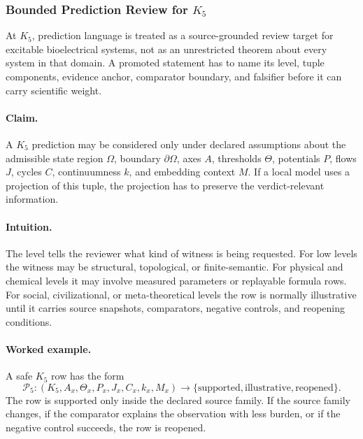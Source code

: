 \subsubsection{Bounded Prediction Review for \texorpdfstring{$K_5$}{K_5}}
\label{sec:predictions-k5-r014}

At \(K_5\), prediction language is treated as a source-grounded review
target for excitable bioelectrical systems, not as an unrestricted theorem about every system in that
domain. A promoted statement has to name its level, tuple components, evidence
anchor, comparator boundary, and falsifier before it can carry scientific
weight.

\paragraph{Claim.}
A \(K_5\) prediction may be considered only under declared assumptions
about the admissible state region \(\Omega\), boundary \(\partial\Omega\), axes
\(A\), thresholds \(\Theta\), potentials \(P\), flows \(J\), cycles \(C\),
continuumness \(k\), and embedding context \(M\). If a local model uses a
projection of this tuple, the projection has to preserve the verdict-relevant
information.

\paragraph{Intuition.}
The level tells the reviewer what kind of witness is being requested. For low
levels the witness may be structural, topological, or finite-semantic. For
physical and chemical levels it may involve measured parameters or replayable
formula rows. For social, civilizational, or meta-theoretical levels the row is
normally illustrative until it carries source snapshots, comparators, negative
controls, and reopening conditions.

\paragraph{Worked example.}
A safe \(K_5\) row has the form
\[
  \mathcal{P}_{5}:
  (K_5, A_x, \Theta_x, P_x, J_x, C_x, k_x, M_x)
  \longrightarrow
  \{\mathrm{supported},\mathrm{illustrative},\mathrm{reopened}\}.
\]
The row is supported only inside the declared source family. If the source
family changes, if the comparator explains the observation with less burden, or
if the negative control succeeds, the row is reopened.

